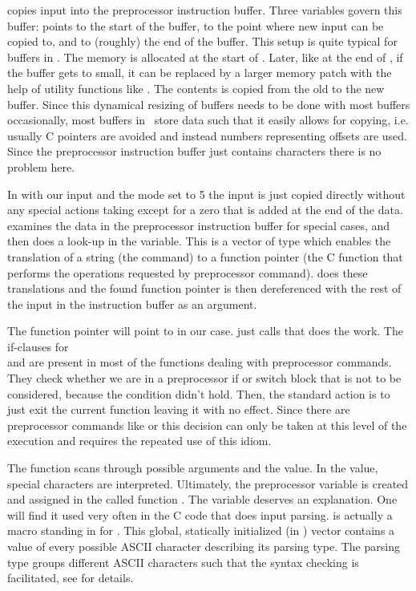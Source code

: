  copies input into the preprocessor instruction buffer.
Three variables govern this buffer:  points to the start of the
buffer,  to the point where new input can be copied to, and
 to (roughly) the end of the buffer. This setup is quite typical
for buffers in \FORM. The memory is allocated at the start of \FORM. Later, like
at the end of , if the buffer gets to small, it can be
replaced by a larger memory patch with the help of utility functions like
. The contents is copied from the old to the new buffer. Since
this dynamical resizing of buffers needs to be done with most buffers
occasionally, most buffers in \FORM\ store data such that it easily allows for
copying, i.e.  usually C pointers are avoided and instead numbers representing
offsets are used. Since the preprocessor instruction buffer just contains
characters there is no problem here.

In  with our input and the mode set to 5 the input is just
copied directly without any special actions taking except for a zero that is
added at the end of the data.  examines the data in the
preprocessor instruction buffer for special cases, and then does a look-up in
the  variable. This is a vector of type  which enables
the translation of a string (the command) to a function pointer (the C function
that performs the operations requested by preprocessor command).
 does these translations and the found function pointer is then
dereferenced with the rest of the input in the instruction buffer as an argument.

The function pointer will point to  in our case. 
just calls  that does the work. The if-clauses for \\
 and  are present in most of the
functions dealing with preprocessor commands. They check whether we are in a
preprocessor if or switch block that is not to be considered, because the
condition didn't hold. Then, the standard action is to just exit the current
function leaving it with no effect. Since there are preprocessor commands like
 or  this decision can only be taken at this level of the
execution and requires the repeated use of this idiom.

The function scans through possible arguments and the value. In the value, special
characters are interpreted. Ultimately, the preprocessor variable is created and
assigned in the called function . The variable 
deserves an explanation. One will find it used very often in the C code that
does input parsing.  is actually a macro standing in for
. This global, statically initialized (in ) vector
contains a value of every possible ASCII character describing its parsing type.
The parsing type groups different ASCII characters such that the syntax checking
is facilitated, see  for details.

